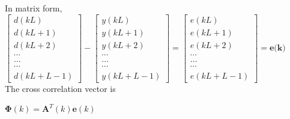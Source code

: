\documentclass[conference]{IEEEtran}
\begin{document}
In matrix form,\\
$\left[ \begin{array}{l}{d(k L)} \\ {d(k L+1)} \\ {d(k L+2)} \\ {\cdots} \\ {\dots} \\ {\cdots} \\ {d(k L+L-1)}\end{array}\right] - \left[ \begin{array}{l}{y(k L)} \\ {y(k L+1)} \\ {y(k L+2)} \\ {\cdots} \\ {\dots} \\ {\cdots} \\ {y(k L+L-1)}\end{array}\right] = \left[ \begin{array}{l}{e(k L)} \\ {e(k L+1)} \\ {e(k L+2)} \\ {\cdots} \\ {\dots} \\ {\cdots} \\ {e(k L+L-1)}\end{array}\right] = \textbf{e(k)}$\\

The cross correlation vector is
\begin{center}
$\mathbf{\Phi}(k)=\mathbf{A}^{T}(k) \mathbf{e}(k)$
\end{center}
\end{document}
